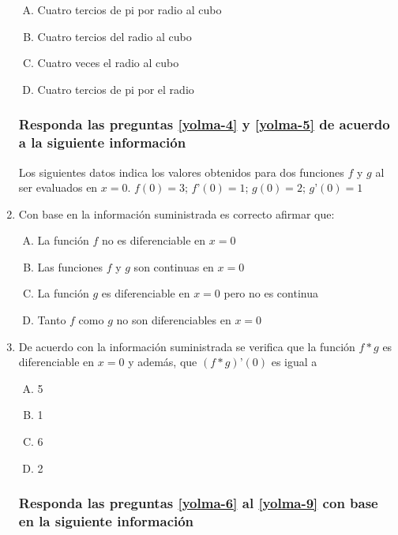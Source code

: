 \begin{enumerate}
\begin{enumerate}[(A)]
\item  Cuatro tercios de pi por radio al cubo
\item Cuatro tercios del radio al cubo
\item Cuatro veces el radio al cubo
\item Cuatro tercios de pi por el radio
\end{enumerate}

\subsubsection*{Responda las preguntas \ref{yolma-4} y \ref{yolma-5} de acuerdo a la siguiente información}

Los siguientes datos indica los valores obtenidos para dos funciones $f$ y $g$ al ser evaluados en $x=0$.  $f(0)=3$; $f’(0)=1$; $g(0)=2$; $g’(0)=1$


\newpage
\item Con base en la información suministrada es correcto afirmar que: \label{yolma-4}\\

\begin{enumerate}[(A)]
\item  La función $f$ no es diferenciable en $x=0$
\item Las funciones $f$ y $g$ son continuas en $x=0$
\item La función $g$ es diferenciable en $x=0$ pero no es continua
\item Tanto $f$ como $g$ no son diferenciables en $x=0$
\end{enumerate}


\item De acuerdo con la información suministrada se verifica que la función $f*g$ es diferenciable en $x=0$ y además, que $(f*g)’(0)$ es igual a \label{yolma-5}\\

\begin{enumerate}[(A)]
\item  5
\item 1
\item 6
\item 2
\end{enumerate}


\subsubsection*{Responda las preguntas \ref{yolma-6}  al \ref{yolma-9} con base en la siguiente información}


\end{enumerate}
